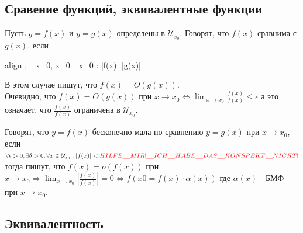 \documentclass[oneside]{book}
\newcommand{\boxedeq}[2]{\begin{empheq}[box={\fboxsep=6pt\fbox}]{align}\label{#1}#2\end{empheq}}
\begin{document}
\begin{enumerate}
\setcounter{chapter}{12}
    \chapter[Сравнение функций]{Сравение функций, эквивалентные функции}
    Пусть $y = f(x)$ и $y = g(x)$ определены в $_{x_0}$. Говорят, что $f(x)$ сравнима с $g(x)$, если
    \boxedeq{eq:*}{
        \exists \epsilon, \exists \mathcal{U}_{x_0}, \forall x_0 \in \mathcal{U}_{x_0} : |f(x)| \leq \epsilon |g(x)|
    }
    В этом случае пишут, что $f(x) = O(g(x))$. \\
    Очевидно, что $f(x) = O(g(x))$ при $x \rightarrow x_0 \Leftrightarrow \lim_{x \rightarrow x_0}{\frac{f(x)}{f(x)}} \leq \epsilon$
    а это означает, что $\frac{f(x)}{f(x)}$ ограничена в $\mathcal{U}_{x_0}$.

    Говорят, что $y = f(x)$ бесконечно мала по сравнению $y = g(x)$ при $x \rightarrow x_0$, если
    $\forall \epsilon > 0, \exists \delta > 0, \forall x \in \mathcal{U}_{x_0} : |f(x)| < \\
    \textcolor{red}{\LARGE{HILFE\_MIR!\_ICH\_HABE\_DAS\_KONSPEKT\_NICHT!}}$ тогда пишут, что
    $f(x) = o(f(x))$ при $x \rightarrow x_0 \Rightarrow \lim_{x \rightarrow x_0}{|\frac{f(x)}{f(x)}|} = 0 \Leftrightarrow f(x0 = f(x) \cdot \alpha(x))$
    где $\alpha(x)$ - БМФ при $x \rightarrow x_0$.

    \section{Эквивалентность}


\end{enumerate}
\end{document}
